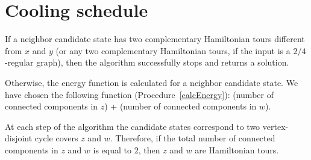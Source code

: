 \documentclass[runningheads]{llncs}
\begin{document}
\section{Cooling schedule} %

If a neighbor candidate state has two complementary Hamiltonian tours different from $x$ and $y$ (or any two complementary Hamiltonian tours, if the input is a $2/4$-regular graph), then the algorithm successfully stops and returns a solution.

Otherwise, the energy function is calculated for a neighbor candidate state.
We have chosen the following function
(Procedure~\ref{calcEnergy}): (number of connected components in $z$) + (number of connected components in $w$).

\DontPrintSemicolon
{}
\begin{algorithm}[h]
	\label{calcEnergy}
	\caption{Energy function}
	
	\BlankLine
	\Proc{\calculateEnergy{\z, \w}}{
		\Return \countComponents{\z} + \countComponents{\w}\;
	}
	\BlankLine
\end{algorithm}

At each step of the algorithm the candidate states correspond to two vertex-disjoint cycle covers $z$ and $w$. Therefore, if the total number of connected components in $z$ and $w$ is equal to $2$, then $z$ and $w$ are Hamiltonian tours. %
\end{document}
